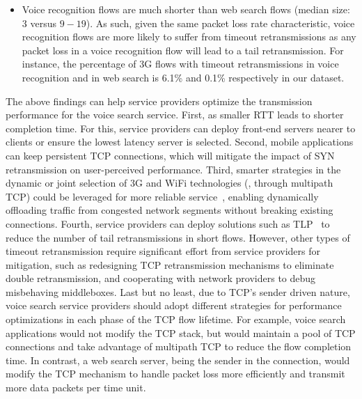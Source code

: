 \begin{itemize}
	\item Voice recognition flows are much shorter than web search flows (median size: 3 versus $9-19$). As such, given the same packet loss rate characteristic, voice recognition flows are more likely to suffer from timeout retransmissions as any packet loss in a voice recognition flow will lead to a tail retransmission. 	For instance, the percentage of 3G flows with timeout retransmissions in voice recognition and in web search is 6.1\% and 0.1\% respectively in our dataset.
	
	
	
	
\end{itemize}

The above findings can help service providers optimize the transmission performance for the voice search service. First, as smaller RTT leads to shorter completion time. For this, service providers can deploy front-end servers nearer to clients or ensure the lowest latency server is selected. Second, mobile applications can keep persistent TCP connections, which will mitigate the impact of SYN retransmission on user-perceived performance. Third, smarter strategies in the dynamic or joint selection of 3G and WiFi technologies (\eg, through multipath TCP) could be leveraged for more reliable service~\cite{UM-CS-2012-022,Chen:2013:MSM:2504730.2504751}, enabling dynamically offloading traffic from congested network segments without breaking existing connections. Fourth, service providers can deploy solutions such as TLP~\cite{flach2013reducing} to reduce the number of tail retransmissions in short flows. However, other types of timeout retransmission require significant effort from service providers for mitigation, such as redesigning TCP retransmission mechanisms to eliminate double retransmission, and cooperating with network providers to debug misbehaving middleboxes. Last but no least, due to TCP's sender driven nature, voice search service providers should adopt different strategies for performance optimizations in each phase of the TCP flow lifetime. For example, voice search applications would not modify the TCP stack, but would maintain a pool of TCP connections and take advantage of multipath TCP to reduce the flow completion time. In contrast, a web search server, being the sender in the connection, would modify the TCP mechanism to handle packet loss more efficiently and transmit more data packets per time unit.

